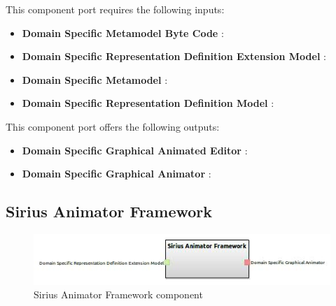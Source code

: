 \documentclass{gemoc} %
\begin{document}
This component port requires the following inputs:
\begin{itemize}
  \item \textbf{Domain Specific Metamodel Byte Code} :
  \item \textbf{Domain Specific Representation Definition Extension Model} :
  \item \textbf{Domain Specific Metamodel} :
  \item \textbf{Domain Specific  Representation Definition Model} :
\end{itemize}

This component port offers the following outputs:
\begin{itemize}
  \item \textbf{Domain Specific Graphical Animated Editor} :
  \item \textbf{Domain Specific Graphical Animator} :
\end{itemize}

\subsection{Sirius Animator Framework}

\begin{figure}[htp]
	\begin{center}
	\includegraphics*[trim=0.0cm 0.0cm 0cm 0.0cm, clip=true, scale=1.0]{../images/generated/Generated_Sirius Animator Framework.jpg}
	\caption{Sirius Animator Framework component}
	\end{center}
\end{figure}
\end{document}
